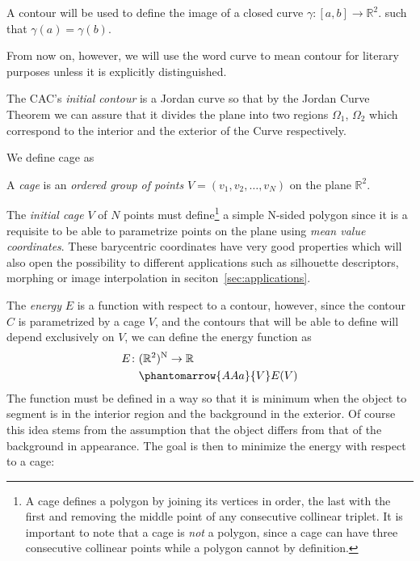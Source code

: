 \begin{definition}
	A contour will be used to define the image of a closed curve $\gamma:[a,b]\to \mathbb{R}^2$. such that $\gamma(a)=\gamma(b)$.
\end{definition}

From now on, however, we will use the word curve to mean contour for literary purposes unless it is explicitly distinguished.

The CAC's \textit{initial contour} is a Jordan curve so that by the Jordan Curve Theorem we can assure that it divides the plane into two regions $\Omega_1$, $\Omega_2$ which correspond to the interior and the exterior of the Curve respectively.

We define cage as
\begin{definition}
	A \textit{cage} is an \textit{ordered group of points}  $V=(v_1, v_2, \dots , v_N)$ on the plane $\mathbb{R}^2$.
\end{definition}

 The \textit{initial cage} $V$ of $N$ points must define\footnote{A cage defines a polygon by joining its vertices in order, the last with the first and removing the middle point of any consecutive collinear triplet. It is important to note that a cage is \textit{not} a polygon, since a cage can have three consecutive collinear points while a polygon cannot by definition.} a simple N-sided polygon since it is a requisite to be able to parametrize points on the plane using \textit{mean value coordinates}. These barycentric coordinates have very good properties which will also open the possibility to different applications such as silhouette descriptors, morphing or image interpolation in seciton~\ref{sec:applications}.

The \textit{energy} $E$ is a function with respect to a contour, however, since the contour $C$ is parametrized by a cage $V$, and the contours that will be able to define will depend exclusively on $V$, we can define the energy function as 
\begin{equation} %
\begin{split}
E \colon & (\mathbb{R}^{2})^\mathrm{N} \to \mathbb{R} \\
& \phantomarrow{AAa}{V} E(V) 
\end{split}
\end{equation}
The function must be defined in a way so that it is minimum when the object to segment is in the interior region and the background in the exterior. Of course this idea stems from the assumption that the object differs from that of the background in appearance. The goal is then to minimize the energy with respect to a cage:

